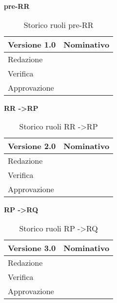 \textbf{pre-RR}

\begin{table}[h]
\begin{center}

\begin{tabular}{p{} p{}}
\toprule
\textbf{Versione 1.0}	&	\textbf{Nominativo}\\
\midrule
\midrule
Redazione	&	\AB \newline
				 \VP \\
\midrule
Verifica &	\MB	\\
\midrule
Approvazione	&	\EZ	\\
\bottomrule
\end{tabular}
\caption{Storico ruoli pre-RR}
\label{tabVers1}
\end{center}
\end{table}


\textbf{RR -\textgreater RP}

\begin{table}[h]
\begin{center}

\begin{tabular}{p{} p{}}
\toprule
\textbf{Versione 2.0}	&	\textbf{Nominativo}\\
\midrule
\midrule
Redazione	&	\SL \\
\midrule
Verifica &	\FZ	\\
\midrule
Approvazione	&	\AB	\\
\bottomrule
\end{tabular}
\caption{Storico ruoli RR -\textgreater RP}
\label{tabVers1}
\end{center}
\end{table}

\textbf{RP -\textgreater RQ}

\begin{table}[h]
\begin{center}

\begin{tabular}{p{} p{}}
\toprule
\textbf{Versione 3.0}	&	\textbf{Nominativo}\\
\midrule
\midrule
Redazione	&	\EZ \\
\midrule
Verifica &	\SL	\\
\midrule
Approvazione	&	\FZ	\\
\bottomrule
\end{tabular}
\caption{Storico ruoli RP -\textgreater RQ}
\label{tabVers1}
\end{center}
\end{table}

